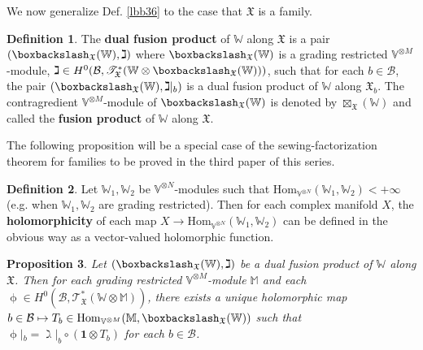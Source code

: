 \documentclass[11pt,b5paper,notitlepage]{article}
\theoremstyle{definition}
\newtheorem{df}{Definition}[section]
\theoremstyle{plain}
\newtheorem{pp}[df]{Proposition}
\newcommand{\idt}{\mathbf{1}}
\newcommand{\Hom}{\mathrm{Hom}}
\newcommand{\scr}{\mathscr}
\newcommand{\Vbb}{\mathbb V}
\newcommand{\Wbb}{\mathbb W}
\newcommand{\Mbb}{\mathbb M}
\newcommand{\<}{\left\langle}
\renewcommand{\>}{\right\rangle}
\newcommand{\MB}{\mathcal{B}}
\newcommand{\fx}{\mathfrak{X}}
\newcommand{\bbs}{\boxbackslash}
\numberwithin{equation}{section}
\begin{document}
We now generalize Def. \ref{lbb36} to the case that $\fx$ is a family.

\begin{df}\label{lbb38}
The \textbf{dual fusion product} of $\Wbb$ along $\fx$ is a pair $(\bbs_\fx(\Wbb),\gimel)$ where $\bbs_\fx(\Wbb)$ is a grading restricted $\Vbb^{\otimes M}$-module, $\gimel\in H^0(\MB,\scr T^*_\fx(\Wbb\otimes\bbs_\fx(\Wbb)))$, such that for each $b\in\MB$, the pair $(\bbs_\fx(\Wbb),\gimel|_b)$ is a dual fusion product of $\Wbb$ along $\fx_b$. The contragredient $\Vbb^{\otimes M}$-module of $\bbs_\fx(\Wbb)$ is denoted by $\boxtimes_\fx(\Wbb)$ and called the \textbf{fusion product} of $\Wbb$ along $\fx$.
\end{df}


The following proposition will be a special case of the sewing-factorization theorem for families to be proved in the third paper of this series.


\begin{df}
Let $\Wbb_1,\Wbb_2$ be $\Vbb^{\otimes N}$-modules such that $\Hom_{\Vbb^{\otimes N}}(\Wbb_1,\Wbb_2)<+\infty$ (e.g. when $\Wbb_1,\Wbb_2$ are grading restricted). Then for each complex manifold $X$, the \textbf{holomorphicity} of each map $X\rightarrow \Hom_{\Vbb^{\otimes N}}(\Wbb_1,\Wbb_2)$ can be defined in the obvious way as a vector-valued holomorphic function. 
\end{df}

\begin{pp}\label{lbb39}
Let $(\bbs_\fx(\Wbb),\gimel)$ be a dual fusion product of $\Wbb$ along $\fx$. Then for each grading restricted $\Vbb^{\otimes M}$-module $\Mbb$ and each $\upphi\in H^0(\MB,\scr T_\fx^*(\Wbb\otimes\Mbb))$, there exists a unique holomorphic map $b\in\MB\mapsto T_b\in \Hom_{\Vbb^{\otimes M}}(\Mbb,\bbs_\fx(\Wbb))$ such that $\upphi|_b=\gimel|_b\circ(\idt\otimes T_b)$ for each $b\in\MB$.
\end{pp}
\end{document}
